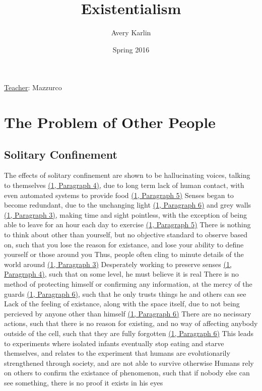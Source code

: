 \documentclass[11 pt, twoside]{article}
\newenvironment{outline*}
{
	\begin{outline}[enumerate]
	}
	{\end{outline}
}
\newcommand{\foota}[2]{\hyperlink{#1}{(#1, Paragraph #2)}}
\begin{document}
\title{Existentialism}
\author{Avery Karlin}
\date{Spring 2016}
\newcommand{\teacher}{Mazzurco}

\maketitle
\newpage
\hypertarget{content}{\tableofcontents}
\vspace{11pt}
\noindent
\underline{Teacher}: \teacher
\newpage

\section{The Problem of Other People}
\subsection{Solitary Confinement}
\begin{outline*}
\1 The effects of solitary confinement are shown to be hallucinating voices, talking to themselves \foota{1}{4}, due to long term lack of human contact, with even automated systems to provide food \foota{1}{5}
\2 Senses began to become redundant, due to the unchanging light \foota{1}{6} and grey walls \foota{1}{3}, making time and sight pointless, with the exception of being able to leave for an hour each day to exercise \foota{1}{5}
\3 There is nothing to think about other than yourself, but no objective standard to observe based on, such that you lose the reason for existance, and lose your ability to define yourself or those around you
\3 Thus, people often cling to minute details of the world around \foota{1}{3}
\3 Desperately working to preserve senses \foota{1}{4}, such that on some level, he must believe it is real
\2 There is no method of protecting himself or confirming any information, at the mercy of the guards \foota{1}{6}, such that he only trusts things he and others can see
\2 Lack of the feeling of existance, along with the space itself, due to not being percieved by anyone other than himself \foota{1}{6}
\3 There are no necissary actions, such that there is no reason for existing, and no way of affecting anybody outside of the cell, such that they are fully forgotten \foota{1}{6}
\4 This leads to experiments where isolated infants eventually stop eating and starve themselves, and relates to the experiment that humans are evolutionarily strengthened through society, and are not able to survive otherwise
\3 Humans rely on others to confirm the existance of phenomenon, such that if nobody else can see something, there is no proof it exists in his eyes
\end{outline*}
\end{document}
